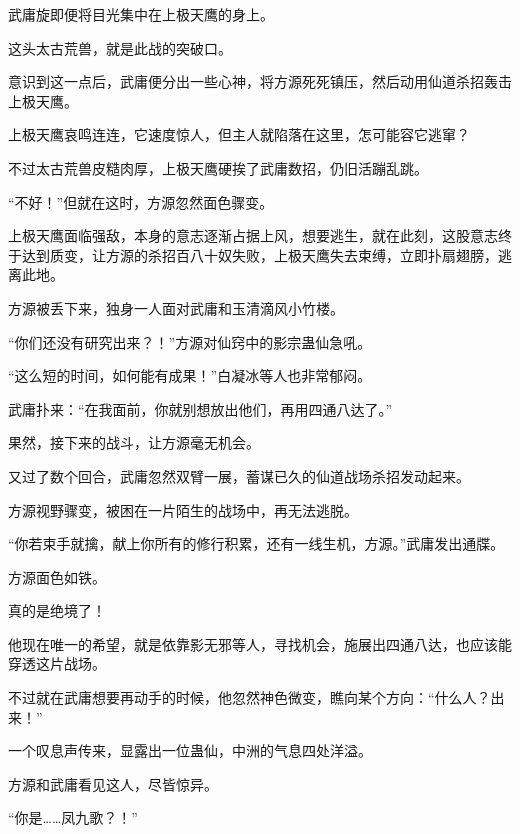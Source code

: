 \begin{this_body}
武庸旋即便将目光集中在上极天鹰的身上。

这头太古荒兽，就是此战的突破口。

意识到这一点后，武庸便分出一些心神，将方源死死镇压，然后动用仙道杀招轰击上极天鹰。

上极天鹰哀鸣连连，它速度惊人，但主人就陷落在这里，怎可能容它逃窜？

不过太古荒兽皮糙肉厚，上极天鹰硬挨了武庸数招，仍旧活蹦乱跳。

“不好！”但就在这时，方源忽然面色骤变。

上极天鹰面临强敌，本身的意志逐渐占据上风，想要逃生，就在此刻，这股意志终于达到质变，让方源的杀招百八十奴失败，上极天鹰失去束缚，立即扑扇翅膀，逃离此地。

方源被丢下来，独身一人面对武庸和玉清滴风小竹楼。

“你们还没有研究出来？！”方源对仙窍中的影宗蛊仙急吼。

“这么短的时间，如何能有成果！”白凝冰等人也非常郁闷。

武庸扑来：“在我面前，你就别想放出他们，再用四通八达了。”

果然，接下来的战斗，让方源毫无机会。

又过了数个回合，武庸忽然双臂一展，蓄谋已久的仙道战场杀招发动起来。

方源视野骤变，被困在一片陌生的战场中，再无法逃脱。

“你若束手就擒，献上你所有的修行积累，还有一线生机，方源。”武庸发出通牒。

方源面色如铁。

真的是绝境了！

他现在唯一的希望，就是依靠影无邪等人，寻找机会，施展出四通八达，也应该能穿透这片战场。

不过就在武庸想要再动手的时候，他忽然神色微变，瞧向某个方向：“什么人？出来！”

一个叹息声传来，显露出一位蛊仙，中洲的气息四处洋溢。

方源和武庸看见这人，尽皆惊异。

“你是……凤九歌？！”

\end{this_body}

